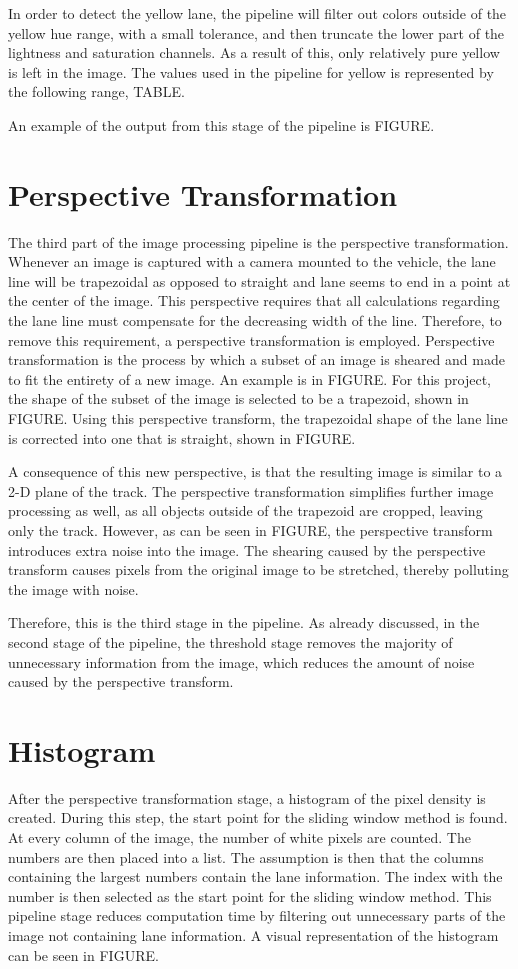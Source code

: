 \documentclass[arbeit=studie,oneside,BCOR=12mm]{ArbeitRST}
\begin{document}
In order to detect the yellow lane, the pipeline will filter out colors outside 
of the yellow hue range, with a small tolerance, and then truncate the lower 
part of the lightness and saturation channels. As a result of this, only 
relatively pure yellow is left in the image.
The values used in the pipeline for yellow is represented by the following 
range,
TABLE.

An example of the output from this stage of the pipeline is FIGURE.

\section{Perspective Transformation}
The third part of the image processing pipeline is the perspective 
transformation. 
Whenever an image is captured with a camera mounted to the vehicle, the lane 
line will be trapezoidal as opposed to straight and lane seems to end in a 
point at the center of the image. This perspective requires that all 
calculations 
regarding the lane line must compensate for the decreasing width of the line. 
Therefore, to remove this requirement, a perspective transformation is 
employed. Perspective transformation is the process 
by which a subset of an image is sheared and made to fit the entirety of a new 
image. An example is in FIGURE. For this project, the shape of the subset of 
the 
image is selected to be a trapezoid, shown in FIGURE. 
Using this perspective transform, the trapezoidal shape of the lane line is 
corrected 
into one that is straight, shown in FIGURE.

A consequence of this new perspective, is that the resulting 
image is similar to a 2-D plane of the track. The perspective transformation 
simplifies further image processing as well, as all objects outside of the 
trapezoid 
are cropped, leaving only the track. However, as can be seen in FIGURE, the 
perspective transform introduces extra noise into the image. The shearing 
caused by the perspective transform causes pixels from the original image to 
be stretched, thereby polluting the image with noise. 

Therefore, this is the third stage in the pipeline. As already discussed, in 
the second stage of the pipeline, the threshold stage removes the majority of 
unnecessary information from the image, which reduces the amount of noise 
caused by the perspective transform.

\section{Histogram}
After the perspective transformation stage, a histogram of the pixel density 
is created. During this step, the start point for the sliding window method is
found. 
At every column of the image, the number of white pixels are counted. 
The numbers are then placed into a list. The assumption is then that the 
columns containing the largest numbers contain the lane information. The 
index with the number is then selected as the start point for the sliding 
window method. This pipeline stage reduces computation time by filtering out 
unnecessary parts of the image not containing lane information. A visual 
representation of the histogram can be seen in FIGURE.
\end{document}
